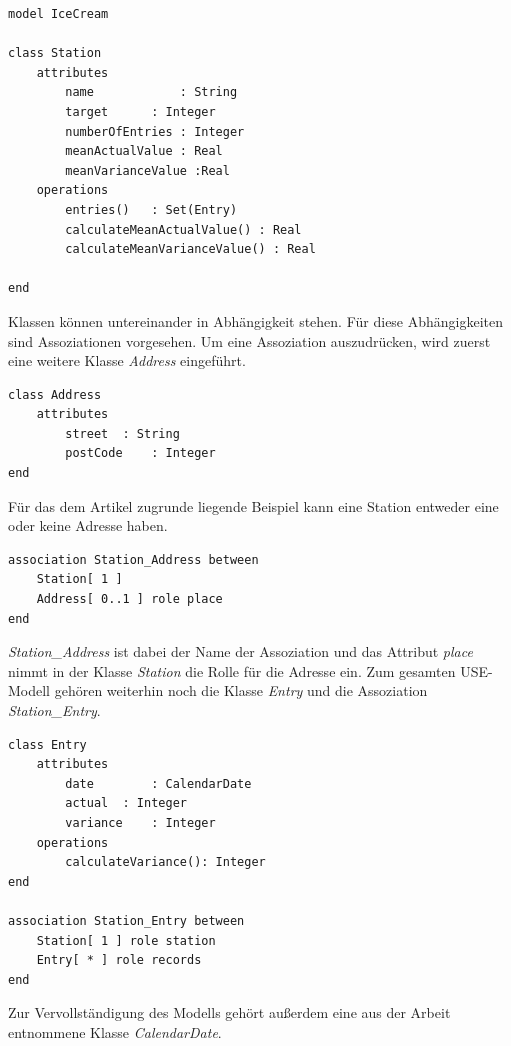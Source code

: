 \documentclass[a4paper,twoside]{article}
\begin{document}
\lstset{basicstyle=\tiny,style=myCustomUseStyle}
\begin{lstlisting}[caption={USE-Spezifikation der Klasse Station im Modell IceCream},label=lst:use1]
model IceCream

class Station
	attributes
		name			: String
		target		: Integer
		numberOfEntries : Integer
		meanActualValue : Real 
		meanVarianceValue :Real
	operations
		entries()	: Set(Entry) 
		calculateMeanActualValue() : Real
		calculateMeanVarianceValue() : Real
		
end
\end{lstlisting}

Klassen können untereinander in Abhängigkeit stehen. Für diese Abhängigkeiten sind Assoziationen vorgesehen. Um eine Assoziation auszudrücken, wird zuerst eine weitere Klasse \textit{Address} eingeführt.

\begin{lstlisting}[caption={USE-Spezifikation der Klasse Adresse},label=lst:use2]
class Address
	attributes
		street	: String
		postCode	: Integer
end
\end{lstlisting}

Für das dem Artikel zugrunde liegende Beispiel kann eine Station entweder eine oder keine Adresse haben.

\begin{lstlisting}[caption={USE-Spezifikation der Assoziation zwischen einer Station und einer Adresse},label=lst:assocs1]
association Station_Address between
	Station[ 1 ] 
	Address[ 0..1 ] role place
end
\end{lstlisting}

\textit{Station\_Address} ist dabei der Name der Assoziation und das Attribut \textit{place} nimmt in der Klasse \textit{Station} die Rolle für die Adresse ein. Zum gesamten USE-Modell gehören weiterhin noch die Klasse \textit{Entry} und die Assoziation \textit{Station\_Entry}.

\begin{lstlisting}[caption={USE-Spezifikation der Klasse Entry und der Assoziation zwischen einer Station und deren Entries},label=lst:assocs2]
class Entry
	attributes
		date		: CalendarDate
		actual	: Integer
		variance	: Integer
	operations
		calculateVariance(): Integer 
end

association Station_Entry between
	Station[ 1 ] role station
	Entry[ * ] role records
end
\end{lstlisting}

Zur Vervollständigung des Modells gehört außerdem eine aus der Arbeit \cite{SilvaMasterThesis} entnommene Klasse \textit{CalendarDate}.
\end{document}
